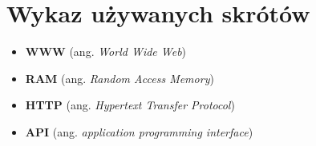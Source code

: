\section{Wykaz używanych skrótów}
\begin{itemize}
  \item \textbf{WWW} (ang. \textit{World Wide Web})
  \item \textbf{RAM} (ang. \textit{Random Access Memory})
  \item \textbf{HTTP} (ang. \textit{Hypertext Transfer Protocol})
  \item \textbf{API} (ang. \textit{application programming interface})
\end{itemize}

